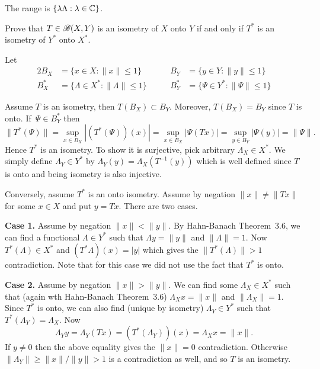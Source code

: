\begin{enumerate}
The range is \(\{\lambda \Lambda: \lambda\in\mathbb{C}\}\).


\begin{excopy}
Prove that \(T \in \mathscr{B}(X,Y)\) is an isometry of $X$ onto $Y$ if and only if
\(T^*\) is an isometry of \(Y^*\) onto \(X^*\).
\end{excopy}

Let 
\begin{alignat*}{2}
B_X  &= \{x \in X: \|x\| \leq 1\} \qquad &
  B_Y  &= \{y \in Y: \|y\| \leq 1\} \\
B_X^* &= \{\Lambda \in X^*: \|\Lambda\| \leq 1\}  \qquad &
  B_Y^* &= \{\Psi \in Y^*: \|\Psi\| \leq 1\} 
\end{alignat*}


Assume $T$ is an isometry, then \(T(B_X)\subset B_Y\).
Moreover, \(T(B_X) = B_Y\) since $T$ is onto.
If~\(\Psi\in B_Y^* \) then
\begin{equation*}
\|T^*(\Psi)\|
 = \sup_{x\in B_X} |(T^*(\Psi))(x)| 
 = \sup_{x\in B_X} |\Psi(Tx)|
 = \sup_{y\in B_Y} |\Psi(y)| 
 = \|\Psi\|.
\end{equation*}
Hence \(T^*\) is an isometry. 
To show it is surjective, pick arbitrary \(\Lambda_X \in X^*\).
We simply define \(\Lambda_Y \in Y^*\) by 
\(\Lambda_Y(y) = \Lambda_X(T^{-1}(y))\) which is well defined
since $T$ is onto and being isometry is also injective.


Conversely, assume \(T^*\) is an onto isometry.
Assume by negation \(\|x\| \neq \|Tx\|\) for some \(x\in X\)
and put \(y = Tx\).
There are two cases.

\textbf{Case 1.}
Assume by negation \(\|x\| < \|y\|\).
By Hahn-Banach Theorem~3.6, we can find a functional \(\Lambda \in Y^*\)
such that \(\Lambda y = \|y\|\) and \(\|\Lambda\| = 1\).
Now \(T^*(\Lambda) \in X^*\) and \((T^*\Lambda)(x) = |y|\)
which gives the \(\|T^*(\Lambda)\| > 1\) contradiction.
Note that for this case we did not use the fact that \(T^*\) is onto.


\textbf{Case 2.}
Assume by negation \(\|x\| > \|y\|\).
We can find some \(\Lambda_X \in X^*\) such that 
(again wth Hahn-Banach Theorem~3.6)
\(\Lambda_X x = \|x\|\)
and
\(\|\Lambda_X\| = 1\).
Since \(T^*\) is onto, we can also find (unique by isometry)
\(\Lambda_Y \in Y^*\) such that \(T^*(\Lambda_Y) = \Lambda_X\).
Now
\begin{equation*}
  \Lambda_Y y
= \Lambda_Y (T x) 
= (T^*(\Lambda_Y)) (x) 
= \Lambda_X x
= \|x\|.
\end{equation*}
If \(y \neq 0\) then the above equality gives the \(\|x\| = 0\) contradiction.
Otherwise  \(\|\Lambda_Y\| \geq \|x\|/\|y\| > 1\) is a contradiction
as well, and so $T$ is an isometry.


\end{enumerate}

